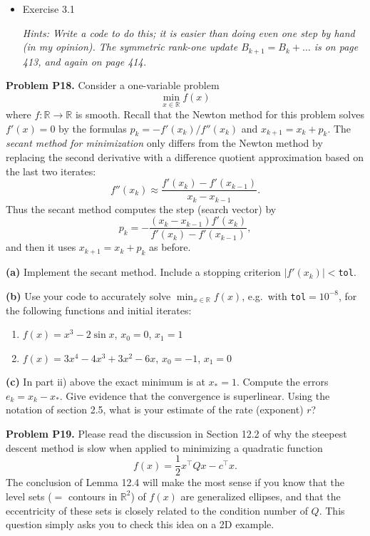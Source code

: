 \documentclass[12pt]{amsart}
\newcommand{\RR}{\mathbb{R}}
\newcommand{\prob}[1]{\bigskip\noindent\textbf{#1}\quad }
\newcommand{\epart}[1]{\medskip\noindent\textbf{(#1)}\quad }
\begin{document}
\begin{itemize}
\item Exercise 3.1 \quad \begin{minipage}[t]{115mm}  \emph{Hints:  Write a code to do this; it is easier than doing even one step by hand (in my opinion).  The symmetric rank-one update $B_{k+1}=B_k+\dots$ is on page 413, and again on page 414.}\end{minipage}
\end{itemize}





\prob{Problem P18.}  Consider a one-variable problem
    $$\min_{x\in\RR} f(x)$$
where $f:\RR\to\RR$ is smooth.  Recall that the Newton method for this problem solves $f'(x)=0$ by the formulas $p_k = - f'(x_k)/f''(x_k)$ and $x_{k+1} = x_k + p_k$.  The \emph{secant method for minimization} only differs from the Newton method by replacing the second derivative with a difference quotient approximation based on the last two iterates:
    $$f''(x_k) \approx \frac{f'(x_k) - f'(x_{k-1})}{x_k - x_{k-1}}.$$
Thus the secant method computes the step (search vector) by
    $$p_k = - \frac{(x_k - x_{k-1}) f'(x_k)}{f'(x_k) - f'(x_{k-1})},$$
and then it uses $x_{k+1} = x_k + p_k$ as before.

\epart{a} Implement the secant method.  Include a stopping criterion $|f'(x_k)| <$\texttt{tol}.

\epart{b} Use your code to accurately solve $\min_{x\in\RR} f(x)$, e.g.~with \texttt{tol}$=10^{-8}$, for the following functions and initial iterates:
    \renewcommand{\labelenumi}{\roman{enumi})}
    \begin{enumerate}
    \item $f(x)=x^3-2\sin x$, \quad $x_0=0$, \quad $x_1=1$
    \item $f(x)=3x^4-4x^3+3x^2-6x$, \quad $x_0=-1$, \quad $x_1=0$
    \end{enumerate}

\epart{c} In part ii) above the exact minimum is at $x_*=1$.  Compute the errors $e_k=x_k-x_*$.  Give evidence that the convergence is superlinear.  Using the notation of section 2.5, what is your estimate of the rate (exponent) $r$?


\prob{Problem P19.}  Please read the discussion in Section 12.2 of why the steepest descent method is slow when applied to minimizing a quadratic function
    $$f(x)= \frac{1}{2} x^\top Q x - c^\top x.$$
The conclusion of Lemma 12.4 will make the most sense if you know that the level sets ($=$ contours in $\RR^2$) of $f(x)$ are generalized ellipses, and that the eccentricity of these sets is closely related to the condition number of $Q$.  This question simply asks you to check this idea on a 2D example.
\end{document}
